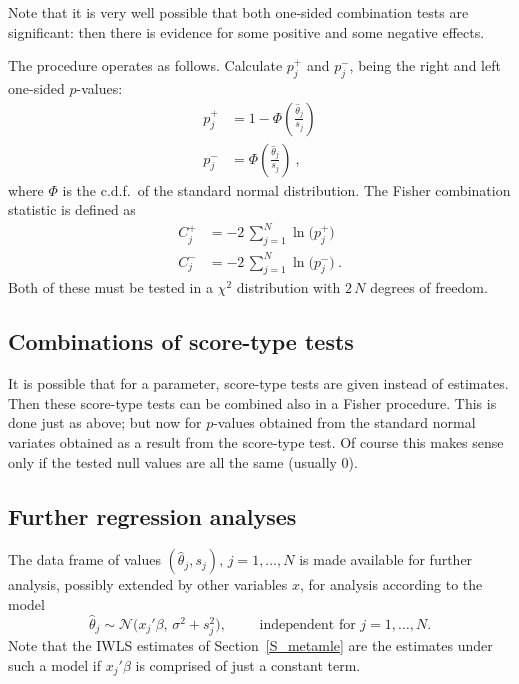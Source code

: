 \documentclass[a4paper,12pt,fleqn]{article}
\begin{document}
Note that it is very well possible that both one-sided combination tests
are significant: then there is evidence for
some positive and some negative effects.

The procedure operates as follows.
Calculate $p_j^+$ and $p_j^-$, being the right and left one-sided
$p$-values:
\begin{align*}
   p_j^+ & = 1 - \Phi\left(\frac{\hat\theta_j}{s_j}\right) \\
   p_j^- & =  \Phi\left(\frac{\hat\theta_j}{s_j}\right) \ ,
\end{align*}
where $\Phi$ is the c.d.f.\ of the standard normal distribution.
The Fisher combination statistic is defined as
\begin{align*}
  C^+_j & = - 2\, \sum_{j=1}^N \ln\big(p_j^+\big) \\
  C^-_j & = - 2\, \sum_{j=1}^N \ln\big(p_j^-\big) \ .
\end{align*}
Both of these must be tested in a $\chi^2$ distribution with
$2\,N$ degrees of freedom.

\subsection{Combinations of score-type tests}

It is possible that for a parameter, score-type tests are given
instead of estimates. Then these score-type tests can be
combined also in a Fisher procedure.
This is done just as above; but now for $p$-values obtained from
the standard normal variates obtained as a result from the score-type test.
Of course this makes sense only if the tested null values are all the same
(usually 0).

\subsection{Further regression analyses}

The data frame of values $(\hat\theta_j, s_j),\, j = 1, \ldots, N$ is made
available for further analysis, possibly extended by other variables $x$,
for analysis according to the model
\begin{equation}
  \hat\theta_j \sim \mathcal{N}\big(x_j'\beta,\, \sigma^2 + s_j^2\big),
           \hspace{2em} \text{ independent for } j = 1, \ldots, N.
\end{equation}
Note that the IWLS estimates of Section~\ref{S_metamle}
are the estimates under such a model
if $x_j' \beta$ is comprised of just a constant term.
\end{document}
